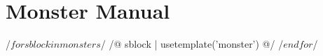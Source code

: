 \documentclass[10pt,twocolumn,twoside,openany]{book}
\begin{document}
\frenchspacing

\chapter{Monster Manual}

\clearpage

/$ for sblock in monsters $/
/@ sblock | usetemplate('monster') @/
\clearpage
/$ endfor $/
\end{document}
